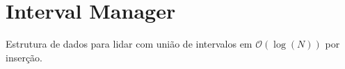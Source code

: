 \section{Interval Manager}
Estrutura de dados para lidar com união de intervalos em $\mathcal{O}(\log(N))$ por inserção.

